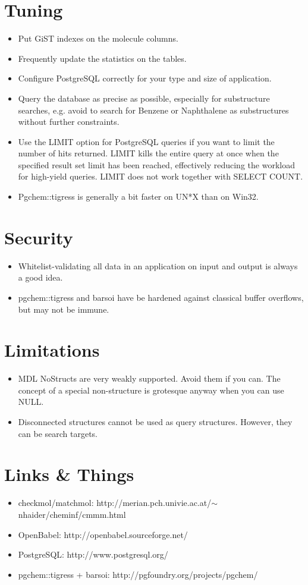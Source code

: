 \documentclass[a4paper]{article}
\begin{document}
\section{Tuning}
\begin{itemize}
\item Put GiST indexes on the molecule columns.
\item Frequently update the statistics on the tables.
\item Configure PostgreSQL correctly for your type and size of application.
\item Query the database as precise as possible, especially for substructure searches, e.g. avoid to search for Benzene or Naphthalene as substructures without further constraints.
\item Use the LIMIT option for PostgreSQL queries if you want to limit the number of hits returned. LIMIT kills the entire query at once when the specified result set limit has been reached, effectively reducing the workload for high-yield queries. LIMIT does not work together with SELECT COUNT.
\item Pgchem::tigress is generally a bit faster on UN*X than on Win32.
\end{itemize}
\section{Security}
\begin{itemize}
\item Whitelist-validating all data in an application on input and output is always a good idea.
\item pgchem::tigress and barsoi have be hardened against classical buffer overflows, but may not be immune.
\end{itemize}
\section{Limitations}
\begin{itemize}
\item MDL NoStructs are very weakly supported. Avoid them if you can. The concept of a special non-structure is grotesque anyway when you can use NULL.
\item Disconnected structures cannot be used as query structures. However, they can be search targets.
\end{itemize}
\section{Links \& Things}
\begin{itemize}
\item checkmol/matchmol: http://merian.pch.univie.ac.at/$\sim$nhaider/cheminf/cmmm.html
\item OpenBabel: http://openbabel.sourceforge.net/
\item PostgreSQL: http://www.postgresql.org/
\item pgchem::tigress + barsoi: http://pgfoundry.org/projects/pgchem/
\end{itemize}
\appendix
\end{document}
